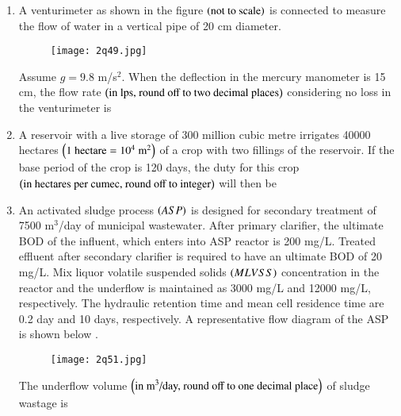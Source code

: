 \documentclass[journal,12pt,onecolumn]{article}
\theoremstyle{remark}
\begin{document}
\begin{enumerate}
\hfill{}

\item A venturimeter as shown in the figure  $\left(\text{not to scale}\right)$ is connected to measure the flow of water in a vertical pipe of 20 cm diameter.
\begin{figure}[H]
    \centering
    \texttt{[image: 2q49.jpg]}
    \caption{}
    \label{fig:q49}
\end{figure}
Assume $g = 9.8$ m/s$^2$. When the deflection in the mercury manometer is 15 cm, the flow rate $\left(\text{in lps, round off to two decimal places}\right)$ considering no loss in the venturimeter is \underline{\hspace{2cm}}

\hfill{}

\item A reservoir with a live storage of 300 million cubic metre irrigates 40000 hectares $\left(\text{1 hectare} = 10^4 \text{ m}^2\right)$ of a crop with two fillings of the reservoir. If the base period of the crop is 120 days, 
the duty for this crop \\
$\left(\text{in hectares per cumec, round off to integer}\right)$ will then be \underline{\hspace{2cm}}

\hfill{}

\item An activated sludge process $\left(ASP\right)$ is designed for secondary treatment of 7500 m$^3$/day of municipal wastewater. After primary clarifier, the ultimate BOD of the influent, which enters into ASP reactor is 200 mg/L. Treated effluent after secondary clarifier is required to have an ultimate BOD of 20 mg/L. Mix liquor volatile suspended solids $\left(MLVSS\right)$ concentration in the reactor and the underflow is maintained as 3000 mg/L and 12000 mg/L, respectively. The hydraulic retention time and mean cell residence time are 0.2 day and 10 days, respectively. A representative flow diagram of the ASP is shown below .
\begin{figure}[H]
    \centering
    \texttt{[image: 2q51.jpg]}
    \caption{}
    \label{fig:q51}
\end{figure}
The underflow volume $\left(\text{in m}^3\text{/day, round off to one decimal place}\right)$ of sludge wastage is \underline{\hspace{2cm}}

\hfill{}


\end{enumerate}
\end{document}
